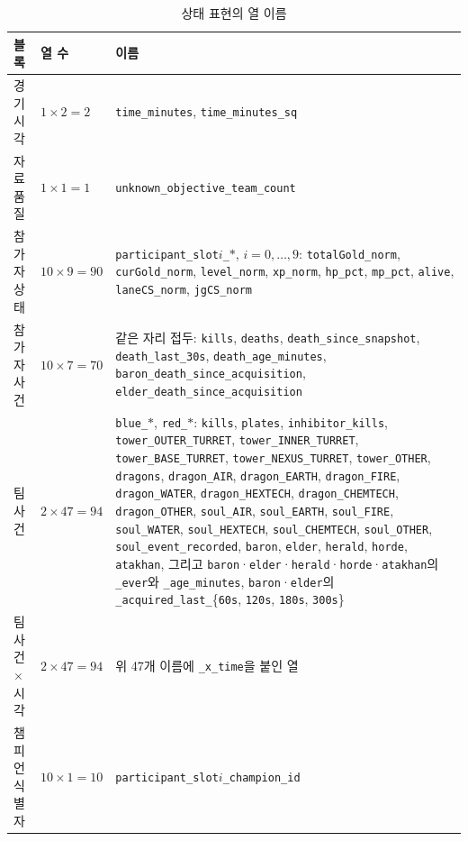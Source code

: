 \begin{table}[H]
  \centering
  \caption{상태 표현의 열 이름}
  \label{tab:app-feature-list}
  \footnotesize
  \begin{tabularx}{\linewidth}{@{}llX@{}}
    \toprule
    블록 & 열 수 & 이름 \\
    \midrule
    경기 시각 & $1 \times 2 = 2$ & \texttt{time\_minutes}, \texttt{time\_minutes\_sq} \\
    \addlinespace
    자료 품질 & $1 \times 1 = 1$ & \texttt{unknown\_objective\_team\_count} \\
    \addlinespace
    참가자 상태 & $10 \times 9 = 90$ & \texttt{participant\_slot}$i$\texttt{\_}$\ast$, $i = 0, \ldots, 9$: \texttt{totalGold\_norm}, \texttt{curGold\_norm}, \texttt{level\_norm}, \texttt{xp\_norm}, \texttt{hp\_pct}, \texttt{mp\_pct}, \texttt{alive}, \texttt{laneCS\_norm}, \texttt{jgCS\_norm} \\
    \addlinespace
    참가자 사건 & $10 \times 7 = 70$ & 같은 자리 접두: \texttt{kills}, \texttt{deaths}, \texttt{death\_since\_snapshot}, \texttt{death\_last\_30s}, \texttt{death\_age\_minutes}, \texttt{baron\_death\_since\_acquisition}, \texttt{elder\_death\_since\_acquisition} \\
    \addlinespace
    팀 사건 & $2 \times 47 = 94$ & \texttt{blue\_}$\ast$, \texttt{red\_}$\ast$: \texttt{kills}, \texttt{plates}, \texttt{inhibitor\_kills}, \texttt{tower\_OUTER\_TURRET}, \texttt{tower\_INNER\_TURRET}, \texttt{tower\_BASE\_TURRET}, \texttt{tower\_NEXUS\_TURRET}, \texttt{tower\_OTHER}, \texttt{dragons}, \texttt{dragon\_AIR}, \texttt{dragon\_EARTH}, \texttt{dragon\_FIRE}, \texttt{dragon\_WATER}, \texttt{dragon\_HEXTECH}, \texttt{dragon\_CHEMTECH}, \texttt{dragon\_OTHER}, \texttt{soul\_AIR}, \texttt{soul\_EARTH}, \texttt{soul\_FIRE}, \texttt{soul\_WATER}, \texttt{soul\_HEXTECH}, \texttt{soul\_CHEMTECH}, \texttt{soul\_OTHER}, \texttt{soul\_event\_recorded}, \texttt{baron}, \texttt{elder}, \texttt{herald}, \texttt{horde}, \texttt{atakhan}, 그리고 \texttt{baron}·\texttt{elder}·\texttt{herald}·\texttt{horde}·\texttt{atakhan}의 \texttt{\_ever}와 \texttt{\_age\_minutes}, \texttt{baron}·\texttt{elder}의 \texttt{\_acquired\_last\_}\{\texttt{60s}, \texttt{120s}, \texttt{180s}, \texttt{300s}\} \\
    \addlinespace
    팀 사건 $\times$ 시각 & $2 \times 47 = 94$ & 위 47개 이름에 \texttt{\_x\_time}을 붙인 열 \\
    \addlinespace
    챔피언 식별자 & $10 \times 1 = 10$ & \texttt{participant\_slot}$i$\texttt{\_champion\_id} \\
    \bottomrule
  \end{tabularx}
\end{table}
